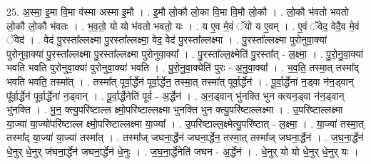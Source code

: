 \documentclass[17pt]{extarticle}
\begin{document}
25. अ॒स्मा॒ इ॒मा वि॒मा व॑स्मा अस्मा इ॒मौ । . इ॒मौ लो॒कौ लो॒का वि॒मा वि॒मौ लो॒कौ । . लो॒कौ भ॑वतो भवतो लो॒कौ लो॒कौ भ॑वतः । . भ॒व॒तो॒ यो यो भ॑वतो भवतो॒ यः । . य ए॒व मे॒वं ॅयो य ए॒वम् । . ए॒वं ॅवेद॒ वेदै॒व मे॒वं ॅवेद॑ । . वेद॑ पु॒रस्ता᳚ल्लक्ष्मा पु॒रस्ता᳚ल्लक्ष्मा॒ वेद॒ वेद॑ पु॒रस्ता᳚ल्लक्ष्मा । . पु॒रस्ता᳚ल्लक्ष्मा पुरोनुवा॒क्या॑ पुरोनुवा॒क्या॑ पु॒रस्ता᳚ल्लक्ष्मा पु॒रस्ता᳚ल्लक्ष्मा पुरोनुवा॒क्या᳚ । . पु॒रस्ता᳚ल्ल॒क्ष्मेति॑ पु॒रस्ता᳚त् - ल॒क्ष्मा॒ । . पु॒रो॒नु॒वा॒क्या॑ भवति भवति पुरोनुवा॒क्या॑ पुरोनुवा॒क्या॑ भवति । . पु॒रो॒नु॒वा॒क्येति॑ पुरः - अ॒नु॒वा॒क्या᳚ । . भ॒व॒ति॒ तस्मा॒त् तस्मा᳚द् भवति भवति॒ तस्मा᳚त् । . तस्मा᳚त् पूर्वा॒र्द्धेन॑ पूर्वा॒र्द्धेन॒ तस्मा॒त् तस्मा᳚त् पूर्वा॒र्द्धेन॑ । . पू॒र्वा॒र्द्धेना॑ न॒ड्वा न॑न॒ड्वान् पू᳚र्वा॒र्द्धेन॑ पूर्वा॒र्द्धेना॑ न॒ड्वान् । . पू॒र्वा॒र्द्धेनेति॑ पूर्व - अ॒र्द्धेन॑ । . अ॒न॒ड्वान् भु॑नक्ति भुन क्त्यन॒ड्वा न॑न॒ड्वान् भु॑नक्ति । . भु॒न॒ क्त्यु॒परि॑ष्टाल्ल क्ष्मो॒परि॑ष्टाल्लक्ष्मा भुनक्ति भुन क्त्यु॒परि॑ष्टाल्लक्ष्मा । . उ॒परि॑ष्टाल्लक्ष्मा या॒ज्या॑ या॒ज्यो॑परि॑ष्टाल्ल क्ष्मो॒परि॑ष्टाल्लक्ष्मा या॒ज्या᳚ । . उ॒परि॑ष्टाल्ल॒क्ष्मेत्यु॒परि॑ष्टात् - ल॒क्ष्मा॒ । . या॒ज्या॑ तस्मा॒त् तस्मा᳚द् या॒ज्या॑ या॒ज्या॑ तस्मा᳚त् । . तस्मा᳚ज् जघना॒र्द्धेन॑ जघना॒र्द्धेन॒ तस्मा॒त् तस्मा᳚ज् जघना॒र्द्धेन॑ । . ज॒घ॒ना॒र्द्धेन॑ धे॒नुर् धे॒नुर् ज॑घना॒र्द्धेन॑ जघना॒र्द्धेन॑ धे॒नुः । . ज॒घ॒ना॒र्द्धेनेति॑ जघन - अ॒र्द्धेन॑ । . धे॒नुर् यो यो धे॒नुर् धे॒नुर् यः । \newline
\end{document}
